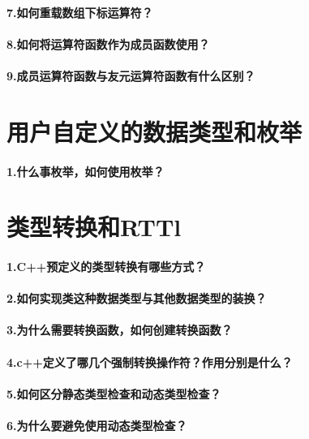 \documentclass[UTF8,a4paper,8pt]{ctexart}
\begin{document}
 	 \paragraph{7.如何重载数组下标运算符？}
 	 \paragraph{8.如何将运算符函数作为成员函数使用？}
 	 \paragraph{9.成员运算符函数与友元运算符函数有什么区别？} 
 	 
\section*{用户自定义的数据类型和枚举}
  	 \paragraph{1.什么事枚举，如何使用枚举？} 

\section*{类型转换和RTTl}
 	 \paragraph{1.C++预定义的类型转换有哪些方式？} 
 	 \paragraph{2.如何实现类这种数据类型与其他数据类型的装换？}
 	 \paragraph{3.为什么需要转换函数，如何创建转换函数？}
 	 \paragraph{4.c++定义了哪几个强制转换操作符？作用分别是什么？}
 	 \paragraph{5.如何区分静态类型检查和动态类型检查？}
 	 \paragraph{6.为什么要避免使用动态类型检查？}
\end{document}
